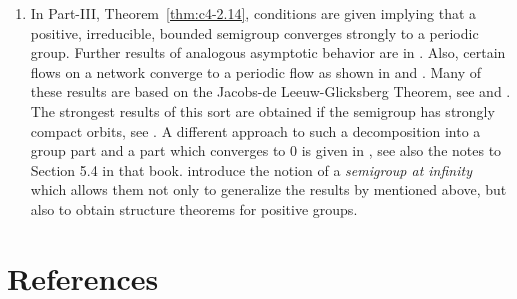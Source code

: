 \begin{enumerate}
 
\item 
In Part-III, Theorem~\ref{thm:c4-2.14}, conditions are given implying that  a positive, irreducible, bounded semigroup converges strongly to a periodic group. 
Further results of analogous asymptotic behavior are in \textcite{zbmath05262335}.
Also, certain flows on a network converge to a periodic flow as shown in \textcite{zbmath02146799} and \textcite{zbmath05598906}.
Many of these results are based on the Jacobs-de Leeuw-Glicksberg Theorem, see  \textcite[Theorem  V.2.8]{zbmath01354832} and \textcite{zbmath06423122}.
The strongest results of this sort are obtained if the semigroup has strongly compact orbits, see  \textcite[Theorem V.2.14]{zbmath01354832}. 
A different approach to such a decomposition into a group part and a part which converges to $0$ is given in \textcite[Chapter V]{zbmath05842872}, see also the notes to Section 5.4 in that book.
\textcite{zbmath07201923} introduce the notion of a \emph{semigroup at infinity} which allows them not only to generalize the results by \textcite{zbmath07124949} mentioned above, but also to obtain structure theorems for positive groups. 


\end{enumerate}
\section*{References}
{\RaggedRight
  \printbibliography[heading=none]
 }